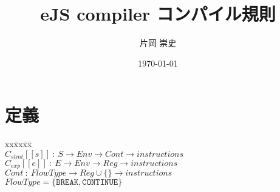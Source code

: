 \documentclass[a4j,12pt]{jarticle}
\title{eJS compiler コンパイル規則}
\author{片岡 崇史}
\date{\today}
\begin{document}
\maketitle

\section{定義}
\footnotesize{
\begin{tabbing}
xx\=xx\=xx\=\kill \\
  $C_{stmt}[[s]]\ :\ S \rightarrow Env \rightarrow Cont \rightarrow instructions$ \\
  $C_{exp}[[e]]\ :\ E \rightarrow Env \rightarrow Reg \rightarrow instructions$ \\
  $Cont\ :\ FlowType \rightarrow Reg \cup \{\} \rightarrow instructions $ \\
  $FlowType = \{ \texttt{BREAK},\texttt{CONTINUE}\}$ \\
\end{tabbing}
}
\end{document}
